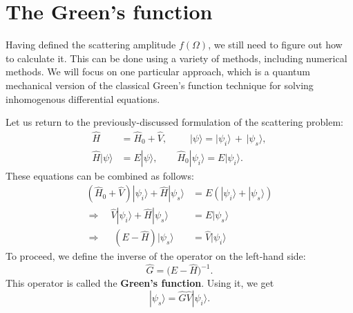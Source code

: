 \documentclass[pra,11pt]{revtex4}
\begin{document}
\section{The Green's function}

Having defined the scattering amplitude $f(\Omega)$, we still need to
figure out how to calculate it.  This can be done using a variety of
methods, including numerical methods.  We will focus on one particular
approach, which is a quantum mechanical version of the classical
Green's function technique for solving inhomogenous differential
equations.

Let us return to the previously-discussed formulation of the
scattering problem:
$$\begin{aligned} \hat{H} &= \hat{H}_0+\hat{V}, \,\,\quad\quad |\psi\rangle = |\psi_i\rangle \,+\, |\psi_s\rangle, \\ \hat{H} |\psi\rangle &= E |\psi\rangle, \quad\quad \hat{H}_0 |\psi_i\rangle = E |\psi_i\rangle.\end{aligned}$$
These equations can be combined as follows:
$$\begin{aligned} \left(\hat{H}_0 + \hat{V}\right) |\psi_i\rangle + \hat{H} |\psi_s\rangle &= E \left( |\psi_i\rangle + |\psi_s\rangle \right) \\ \Rightarrow \quad \hat{V} |\psi_i\rangle + \hat{H} |\psi_s\rangle &= E |\psi_s\rangle  \\ \Rightarrow \quad\; \left(E - \hat{H}\right) |\psi_s\rangle & = \hat{V} |\psi_i\rangle
\end{aligned}$$
To proceed, we define the inverse of the operator on the left-hand
side:
$$\hat{G} = \big(E-\hat{H}\big)^{-1}.$$
This operator is called the \textbf{Green's function}.  Using it, we
get
$$|\psi_s\rangle = \hat{G} \hat{V} |\psi_i\rangle.$$
\end{document}
